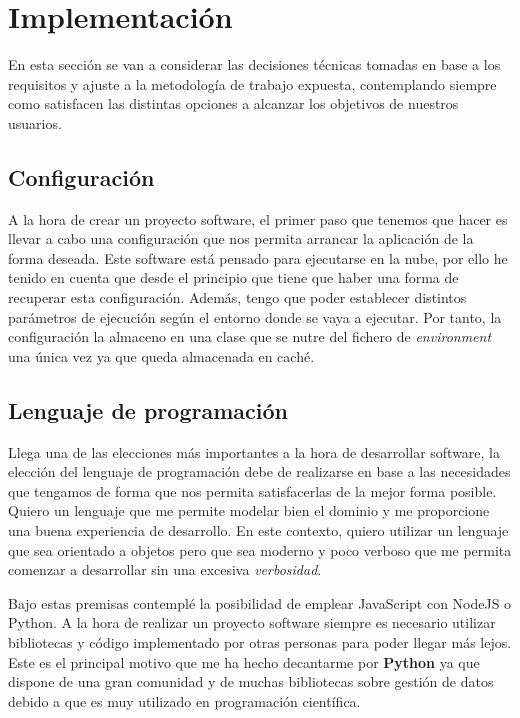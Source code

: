 \section{Implementación}
En esta sección se van a considerar las decisiones técnicas tomadas en base a los
requisitos y ajuste a la metodología de trabajo expuesta, contemplando siempre como
satisfacen las distintas opciones a alcanzar los objetivos de nuestros usuarios.

\subsection{Configuración}
A la hora de crear un proyecto software, el primer paso que tenemos que hacer es llevar a
cabo una configuración que nos permita arrancar la aplicación de la forma deseada. Este
software está pensado para ejecutarse en la nube, por ello he tenido en cuenta que desde
el principio que tiene que haber una forma de recuperar esta configuración. Además, tengo
que poder establecer distintos parámetros de ejecución según el entorno donde se vaya a
ejecutar. Por tanto, la configuración la almaceno en una clase que se nutre del fichero de
\textit{environment} una única vez ya que queda almacenada en caché. 

\subsection{Lenguaje de programación}
Llega una de las elecciones más importantes a la hora de desarrollar software, la elección
del lenguaje de programación debe de realizarse en base a las necesidades que tengamos de
forma que nos permita satisfacerlas de la mejor forma posible. Quiero un lenguaje que me
permite modelar bien el dominio y me proporcione una buena experiencia de desarrollo. En
este contexto, quiero utilizar un lenguaje que sea orientado a objetos pero que sea
moderno y poco verboso que me permita comenzar a desarrollar sin una excesiva
\textit{verbosidad}.

Bajo estas premisas contemplé la posibilidad de emplear JavaScript con NodeJS o Python. A
la hora de realizar un proyecto software siempre es necesario utilizar bibliotecas y
código implementado por otras personas para poder llegar más lejos. Este es el principal
motivo que me ha hecho decantarme por \textbf{Python} ya que dispone de una gran comunidad
y de muchas bibliotecas sobre gestión de datos debido a que es muy utilizado en
programación científica.

